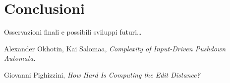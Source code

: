 \documentclass[a4paper,12pt]{report}
\theoremstyle{propositionstyle}
\begin{document}
    \section{Conclusioni}

    Osservazioni finali e possibili sviluppi futuri\ldots

    \clearpage
    \begin{thebibliography}{9}

        Alexander Okhotin, Kai Salomaa,
        \textit{Complexity of Input-Driven Pushdown Automata}.

        Giovanni Pighizzini,
        \textit{How Hard Is Computing the Edit Distance?}


    \end{thebibliography}
\end{document}
